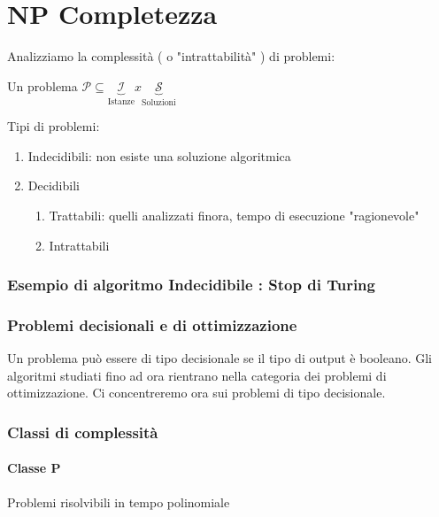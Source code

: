 \chapter{NP Completezza}

Analizziamo la complessità ( o  "intrattabilità" ) di problemi:

Un problema $\mathcal{P} \subseteq \underbrace{\mathcal{I} }_\text{Istanze} x  \underbrace{\mathcal{S} }_\text{Soluzioni}$

Tipi di problemi:

\begin{enumerate}

\item Indecidibili: non esiste una soluzione algoritmica
\item Decidibili
\begin{enumerate}
\item Trattabili: quelli analizzati finora, tempo di esecuzione "ragionevole"
\item Intrattabili
\end{enumerate}

\end{enumerate}

\subsection{Esempio di algoritmo Indecidibile : Stop di Turing}


\subsection{Problemi decisionali e di ottimizzazione}

Un problema può essere di tipo decisionale se il tipo di output è booleano. Gli algoritmi studiati fino ad ora rientrano nella categoria dei problemi di ottimizzazione. Ci concentreremo ora sui problemi di tipo decisionale.

\subsection{Classi di complessità}





\subsubsection{Classe P}
Problemi risolvibili in tempo polinomiale

